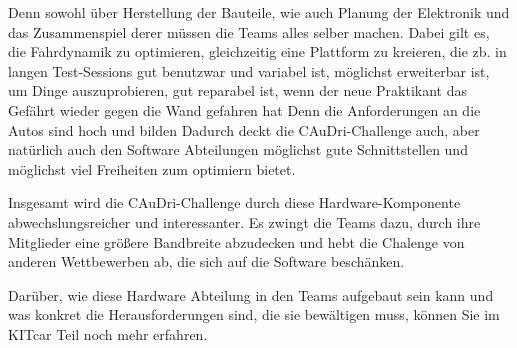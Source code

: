 Denn sowohl über Herstellung der Bauteile, wie auch Planung der Elektronik
und das Zusammenspiel derer müssen die Teams alles selber machen. Dabei
gilt es, die Fahrdynamik zu optimieren, gleichzeitig eine Plattform zu kreieren,
die zb. in langen Test-Sessions gut benutzwar und variabel ist,
möglichst erweiterbar ist, um Dinge auszuprobieren, gut reparabel ist,
wenn der neue Praktikant das Gefährt wieder gegen die Wand gefahren hat
Denn die Anforderungen an die Autos sind hoch und  bilden 
Dadurch deckt die CAuDri-Challenge auch, aber natürlich auch
den Software Abteilungen möglichst gute Schnittstellen und möglichst
viel Freiheiten zum optimiern bietet.

Insgesamt wird die CAuDri-Challenge durch diese Hardware-Komponente
abwechslungsreicher und interessanter.
Es zwingt die Teams dazu, durch ihre Mitglieder eine größere Bandbreite
abzudecken und hebt die Chalenge von anderen Wettbewerben ab, die sich
auf die Software beschänken.

Darüber, wie diese Hardware Abteilung in den Teams aufgebaut sein kann
und was konkret die Herausforderungen sind, die sie bewältigen muss,
können Sie im KITcar Teil noch mehr erfahren.
